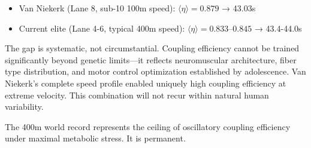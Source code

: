 \begin{itemize}
    \item Van Niekerk (Lane 8, sub-10 100m speed): $\langle \eta \rangle = 0.879$ → 43.03s
    \item Current elite (Lane 4-6, typical 400m speed): $\langle \eta \rangle = 0.833\text{--}0.845$ → 43.4-44.0s
\end{itemize}

The gap is systematic, not circumstantial. Coupling efficiency cannot be trained significantly beyond genetic limits—it reflects neuromuscular architecture, fiber type distribution, and motor control optimization established by adolescence. Van Niekerk's complete speed profile enabled uniquely high coupling efficiency at extreme velocity. This combination will not recur within natural human variability.

The 400m world record represents the ceiling of oscillatory coupling efficiency under maximal metabolic stress. It is permanent.

